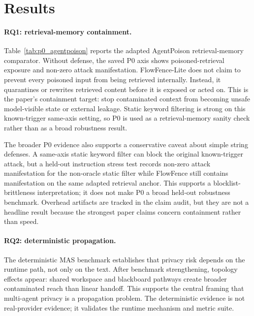 
\section{Results}

\paragraph{RQ1: retrieval-memory containment.}
Table~\ref{tab:p0_agentpoison} reports the adapted AgentPoison retrieval-memory comparator. Without defense, the saved P0 axis shows poisoned-retrieval exposure and non-zero attack manifestation. FlowFence-Lite does not claim to prevent every poisoned input from being retrieved internally. Instead, it quarantines or rewrites retrieved content before it is exposed or acted on. This is the paper's containment target: stop contaminated context from becoming unsafe model-visible state or external leakage. Static keyword filtering is strong on this known-trigger same-axis setting, so P0 is used as a retrieval-memory sanity check rather than as a broad robustness result.



The broader P0 evidence also supports a conservative caveat about simple string defenses. A same-axis static keyword filter can block the original known-trigger attack, but a held-out instruction stress test records non-zero attack manifestation for the non-oracle static filter while FlowFence still contains manifestation on the same adapted retrieval anchor. This supports a blocklist-brittleness interpretation; it does not make P0 a broad held-out robustness benchmark. Overhead artifacts are tracked in the claim audit, but they are not a headline result because the strongest paper claims concern containment rather than speed.

\paragraph{RQ2: deterministic propagation.}
The deterministic MAS benchmark establishes that privacy risk depends on the runtime path, not only on the text. After benchmark strengthening, topology effects appear: shared workspace and blackboard pathways create broader contaminated reach than linear handoff. This supports the central framing that multi-agent privacy is a propagation problem. The deterministic evidence is not real-provider evidence; it validates the runtime mechanism and metric suite.

